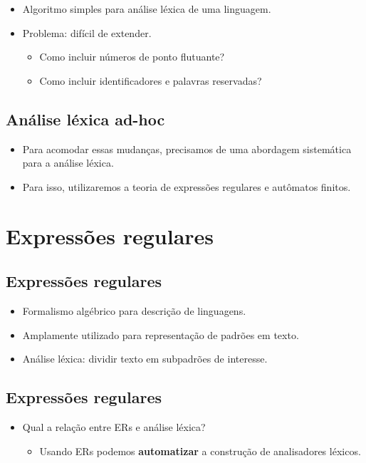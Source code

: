 \documentclass[11pt]{article}
\begin{document}
\begin{itemize}
\item Algoritmo simples para análise léxica de uma linguagem.

\item Problema: difícil de extender.
\begin{itemize}
\item Como incluir números de ponto flutuante?
\item Como incluir identificadores e palavras reservadas?
\end{itemize}
\end{itemize}
\subsection*{Análise léxica ad-hoc}
\label{sec:org4532257}

\begin{itemize}
\item Para acomodar essas mudanças, precisamos de uma abordagem
sistemática para a análise léxica.

\item Para isso, utilizaremos a teoria de expressões regulares
e autômatos finitos.
\end{itemize}
\section*{Expressões regulares}
\label{sec:orgcf96b02}

\subsection*{Expressões regulares}
\label{sec:org5342412}

\begin{itemize}
\item Formalismo algébrico para descrição de linguagens.
\item Amplamente utilizado para representação de padrões em texto.
\item Análise léxica: dividir texto em subpadrões de interesse.
\end{itemize}
\subsection*{Expressões regulares}
\label{sec:org5894ee8}

\begin{itemize}
\item Qual a relação entre ERs e análise léxica?
\begin{itemize}
\item Usando ERs podemos \textbf{\textbf{automatizar}} a construção de analisadores léxicos.
\end{itemize}
\end{itemize}
\end{document}
